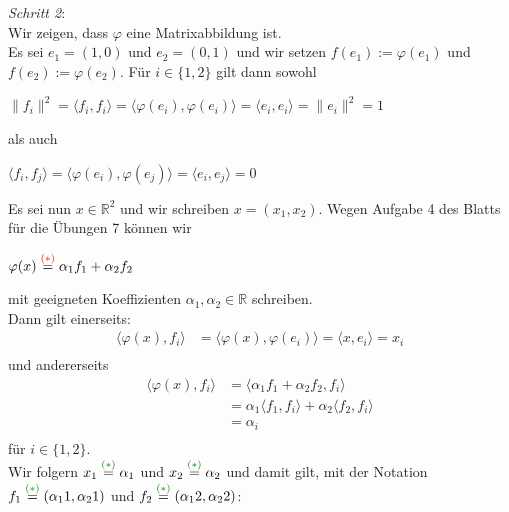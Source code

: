 \documentclass{article}
\begin{document}
\textit{Schritt 2}: \\
Wir zeigen, dass $\varphi$ eine Matrixabbildung ist. \\
Es sei $e_1 = (1,0)$ und $e_2 = (0,1)$ und wir setzen $f(e_1) := \varphi(e_1)$ und $f(e_2) := \varphi(e_2)$. Für $i \in \{1,2\}$ gilt dann sowohl \\
\begin{center}
    $\|f_i\|^2 = \langle f_i, f_i \rangle = \langle \varphi(e_i), \varphi(e_i) \rangle = \langle e_i, e_i \rangle = \|e_i\|^2 = 1$ \\
\end{center}
als auch \\
\begin{center}
    $\langle f_i, f_j \rangle = \langle \varphi(e_i), \varphi(e_j) \rangle = \langle e_i, e_j \rangle = 0$ \\
\end{center}
Es sei nun $x \in \mathbb{R}^2$ und wir schreiben $x = (x_1, x_2)$. Wegen Aufgabe 4 des Blatts für die Übungen 7 können wir \\
\begin{center}
    $\varphi(x) \overset{\textcolor{red}{(*)}}{=} \alpha_1 f_1 + \alpha_2 f_2$
\end{center}
mit geeigneten Koeffizienten $\alpha_1, \alpha_2 \in \mathbb{R}$ schreiben. \\
Dann gilt einerseits:\\
\begin{align*}
    \langle \varphi(x), f_i \rangle &= \langle \varphi(x), \varphi(e_i) \rangle = \langle x, e_i \rangle = x_i \\
\end{align*}
und andererseits \\
\begin{align*}
    \langle \varphi(x), f_i \rangle &= \langle \alpha_1 f_1 + \alpha_2 f_2, f_i \rangle \\
    &= \alpha_1 \langle f_1, f_i \rangle + \alpha_2 \langle f_2, f_i \rangle \\
    &= \alpha_i \\
\end{align*}
für $i \in \{1,2\}$. \\
Wir folgern $x_1 \overset{\textcolor{darkgreen}{(*)}}{=} \alpha_1$ und $x_2 \overset{\textcolor{darkgreen}{(*)}}{=} \alpha_2$ und damit gilt, mit der Notation $f_1 \overset{\textcolor{darkgreen}{(*)}}{=} (\alpha_11, \alpha_21)$ und $f_2 \overset{\textcolor{darkgreen}{(*)}}{=} (\alpha_12, \alpha_22)$: \\
\end{document}
